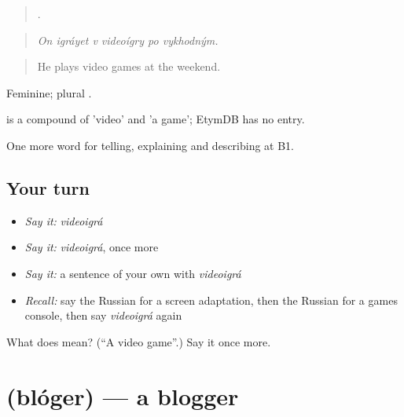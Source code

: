 \begin{quote}
     .
\end{quote}

\begin{quote}
\emph{On igráyet v videoígry po vykhodným.}
\end{quote}

\begin{quote}
He plays video games at the weekend.
\end{quote}

Feminine; plural .

\begin{cousinweb}
\emph{} is a compound of \emph{} 'video' and \emph{} 'a game'; EtymDB has no entry.
\end{cousinweb}

\begin{grammarlens}[title={What you've built}]
One more word for telling, explaining and describing at B1.
\end{grammarlens}

\subsection*{Your turn}
\begin{itemize}
\raggedright
  \item \emph{Say it:} \emph{videoigrá}
  \item \emph{Say it:} \emph{videoigrá}, once more
  \item \emph{Say it:} a sentence of your own with \emph{videoigrá}
  \item \emph{Recall:} say the Russian for a screen adaptation, then the Russian for a games console, then say \emph{videoigrá} again
\end{itemize}

\begin{tcolorbox}[breakable,colback=teal!4,colframe=teal!35!black,title={Before you move on}]
What does  mean? (\textquotedblleft{}A video game\textquotedblright{}.) Say it once more.
\end{tcolorbox}
\section[\texorpdfstring{\ru{блогер} (blóger)}{блогер (blóger)}]{ (blóger) — a blogger}

\label{lesson:RU-C528-bloger}



